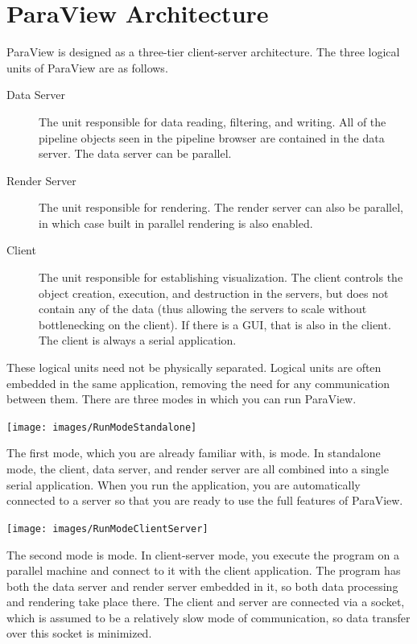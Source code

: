 \section{ParaView Architecture}

ParaView is designed as a three-tier client-server architecture.  The three
logical units of ParaView are as follows.

\begin{description}
\item[Data Server]  The unit responsible for data
  reading, filtering, and writing.  All of the pipeline objects seen in the
  pipeline browser are contained in the data server.  The data server can
  be parallel.
\item[Render Server] The unit responsible for
  rendering.  The render server can also be parallel, in which case built
  in parallel rendering is also enabled.
\item[Client] The unit responsible for establishing
  visualization.  The client controls the object creation, execution, and
  destruction in the servers, but does not contain any of the data (thus
  allowing the servers to scale without bottlenecking on the client).  If
  there is a GUI, that is also in the client.  The client is always a
  serial application.
\end{description}

These logical units need not be physically separated.  Logical units are
often embedded in the same application, removing the need for any
communication between them.  There are three modes in which you can run
ParaView.

\begin{inlinefig}
  \texttt{[image: images/RunModeStandalone]}
\end{inlinefig}

The first mode, which you are already familiar with, is
 mode.  In standalone mode, the client, data server,
and render server are all combined into a single serial application.  When
you run the  application, you are automatically connected
to a  server so that you are ready to use the full
features of ParaView.

\begin{inlinefig}
  \texttt{[image: images/RunModeClientServer]}
\end{inlinefig}

The second mode is  mode.  In client-server mode,
you execute the  program on a parallel machine and
connect to it with the  client application.  The
 program has both the data server and render server
embedded in it, so both data processing and rendering take place there.
The client and server are connected via a socket, which is assumed to be a
relatively slow mode of communication, so data transfer over this socket is
minimized.

